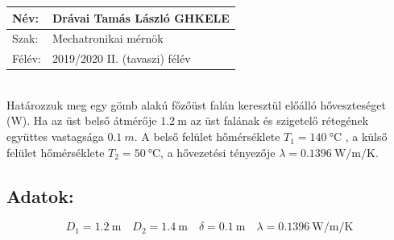 \documentclass[12pt, a4paper, onecolumn]{article}
\begin{document}
\begin{tabular}{ | p{2cm} | p{14cm} | } 
	\hline
	Név: & Drávai Tamás László GHKELE\\ 
	\hline
	Szak: & Mechatronikai mérnök \\ 
	\hline
	Félév: & 2019/2020 II. (tavaszi) félév \\ 
\hline
\end{tabular}
\vspace{4mm} 
\\Határozzuk meg egy gömb alakú főzőüst falán keresztül előálló hőveszteséget (W).  Ha az üst belső átmérője $\SI{1,2}{\meter}$  az üst falának és szigetelő rétegének együttes vastagsága $\SI{0,1}{m}$. A belső felület hőmérséklete $T_1=\SI{140}{\celsius}$ , a külső felület hőmérséklete  $T_2=\SI{50}{\celsius}$,  a hővezetési tényezője $\lambda=\SI[per-mode=fraction]{0,1396}{\watt\per\meter\per\kelvin}$.
\subsection*{ {Adatok:}}
\begin{equation*}
D_1=\SI{1,2}{\meter}  \quad  D_2=\SI{1,4}{\meter} \quad \delta=\SI{0,1}{\meter}\quad
\lambda=\SI[per-mode=fraction]{0,1396}{\watt\per\meter\per\kelvin}
\end{equation*}
\end{document}
